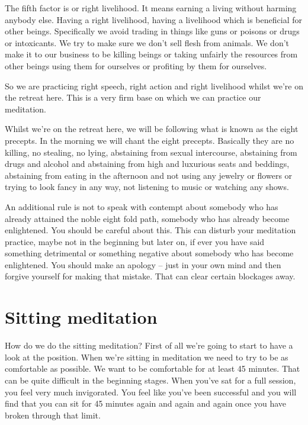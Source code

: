 \documentclass[letterpaper,10pt,english]{sphinxmanual}
\begin{document}
\sphinxAtStartPar
The  fifth  factor  is
or  right  livelihood.  It  means  earning
a living without harming anybody else. Having a right livelihood, having a
livelihood which is beneficial for other beings. Specifically we avoid trading
in things like guns or poisons or drugs or intoxicants. We try to make sure
we don’t sell flesh from animals. We don’t make it to our business to be killing beings or taking unfairly the resources from other beings using them for
ourselves or profiting by them for ourselves.

\sphinxAtStartPar
So  we  are  practicing  right  speech,  right  action  and  right  livelihood
whilst we’re on the retreat here. This is a very firm base on which we can
practice our meditation.

\sphinxAtStartPar
Whilst we’re on the retreat here, we will be following what is known as
the eight precepts. In the morning we will chant the eight precepts. Basically
they are no killing, no stealing, no lying, abstaining from sexual intercourse,
abstaining from drugs and alcohol and abstaining from high and luxurious
seats  and  beddings,  abstaining  from  eating  in  the  afternoon  and  not  using
any jewelry or flowers or trying to look fancy in any way, not listening to
music or watching any shows.

\sphinxAtStartPar
An additional rule is not to speak with contempt about somebody who
has already attained the noble eight fold path, somebody who has already
become enlightened. You should be careful about this. This can disturb your
meditation practice, maybe not in the beginning but later on, if ever you have
said something detrimental or something negative about somebody who has
become enlightened. You should make an apology – just in your own mind
and  then  forgive  yourself  for  making  that  mistake.  That  can  clear  certain
  blockages away.


\section{Sitting meditation}
\label{\detokenize{0-b:sitting-meditation}}
\sphinxAtStartPar
How do we do the sitting meditation? First of all we’re going to start to
have a look at the position. When we’re sitting in meditation we need to try
to be as comfortable as possible. We want to be comfortable for at least 45
minutes. That can be quite difficult in the beginning stages. When you’ve sat
for a full session, you feel very much invigorated. You feel like you’ve been
successful and you will find that you can sit for 45 minutes again and again
and again once you have broken through that limit.
\end{document}
